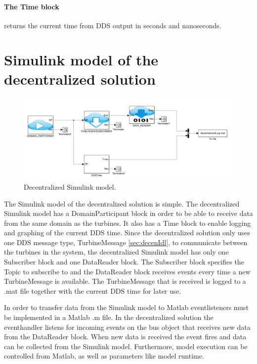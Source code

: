 \paragraph{The Time block} returns the current time from DDS output in seconds and nanoseconds.

\section{Simulink model of the decentralized solution}\label{subsec:decentralizedmodel}

\begin{figure}[!h]
\includegraphics[width=\textwidth]{figures/DecentralizedModel}
	\caption[Decentralized Simulink model]{
		\label{fig:decentralizedSimulinkModel} 
		\footnotesize{%
			Decentralized Simulink model.
		}
	}
\end{figure}

The Simulink model of the decentralized solution is simple. The decentralized Simulink model has a DomainParticipant block in order to be able to receive data from the same domain as the turbines. It also has a Time block to enable logging and graphing of the current DDS time. Since the decentralized solution only uses one DDS message type, TurbineMessage \cref{sec:decenIdl}, to communicate between the turbines in the system, the decentralized Simulink model has only one Subscriber block and one DataReader block. The Subscriber block specifies the Topic to subscribe to and the DataReader block receives events every time a new TurbineMessage is available. The TurbineMessage that is received is logged to a .mat file together with the current DDS time for later use.

In order to transfer data from the Simulink model to Matlab eventlisteners must be implemented in a Matlab .m file. In the decentralized solution the eventhandler listens for incoming events on the bus object that receives new data from the DataReader block. When new data is received the event fires and data can be collected from the Simulink model. Furthermore, model execution can be controlled from Matlab, as well as parameters like model runtime.


